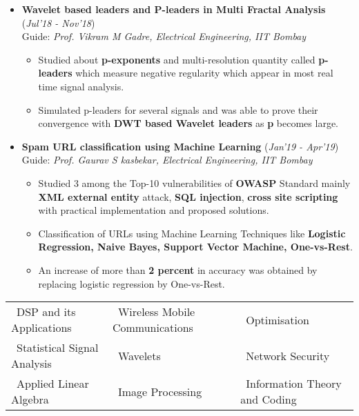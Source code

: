 \documentclass[10pt]{article}
\begin{document}
\begin{itemize}[leftmargin=0.4cm]
\item \textbf{Wavelet based leaders and P-leaders in Multi
Fractal Analysis} 
\hfill{(\textit{Jul'18 - Nov'18})}\\
Guide: \textit{Prof. Vikram M Gadre, Electrical Engineering, IIT Bombay}
	\begin{itemize}
	\item Studied about \textbf{p-exponents} and multi-resolution quantity called \textbf{p-leaders} which measure negative regularity which appear in most real time signal analysis.
	\item Simulated p-leaders for several signals and was able to prove their convergence with \textbf{DWT based Wavelet leaders} as \textbf{p} becomes large.


	\end{itemize}
	

\item \textbf{Spam URL classification using Machine Learning}
\hfill{(\textit{Jan'19 - Apr'19})}\\
Guide: \textit{Prof. Gaurav S kasbekar, Electrical Engineering, IIT Bombay}

	\begin{itemize}
	\item Studied 3 among the Top-10 vulnerabilities of \textbf{OWASP} Standard mainly \textbf{XML external entity} attack, \textbf{SQL injection}, \textbf{cross site scripting} with practical implementation and proposed solutions.
	\item Classification of URLs using Machine Learning Techniques like \textbf{Logistic Regression, Naive Bayes, Support Vector Machine, One-vs-Rest}.
	\item An increase of more than \textbf{2 percent} in accuracy was obtained by replacing logistic regression by One-vs-Rest.
    \end{itemize}

	


\end{itemize}
\hspace{-0.17cm}\colorbox{bl}{}%
	 	
		\begin{tabular}{m{2.3in}m{2.3in}m{2.5in}}
		\hspace{0.55cm}\textbullet\ DSP and its Applications &  \textbullet\ Wireless Mobile Communications  & \textbullet\ Optimisation \\
		\hspace{0.55cm}\textbullet\ Statistical Signal Analysis & \textbullet\ Wavelets & \textbullet\ Network Security \\
		\hspace{0.55cm}\textbullet\ Applied Linear Algebra & \textbullet\ Image Processing & \textbullet\  Information Theory and Coding\\
	\end{tabular}
	
\end{document}
